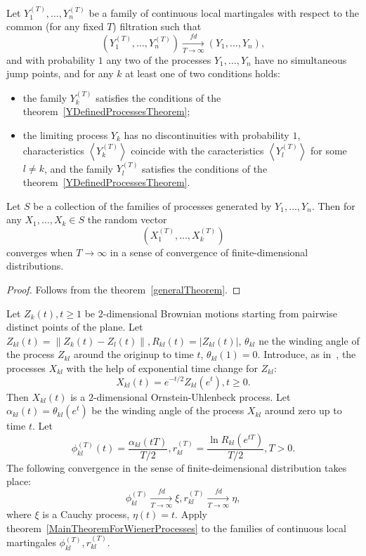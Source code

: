 \documentclass[12pt, a4paper, titlepage]{article}
\begin{document}
\begin{theorem}\label{MainTheoremForWienerProcesses}
 Let $Y_1^{(T)}, \ldots, Y_n^{(T)}$ be a family 
of continuous local martingales with respect to the common
(for any fixed $T$) filtration such that
$$(Y_1^{(T)}, \ldots, Y_n^{(T)})\xrightarrow[T \to \infty]{fd} (Y_1, \ldots, Y_n),$$
and with probability $1$ any two of the processes
$Y_1, \ldots, Y_n$
have no simultaneous jump points, and for any $k$ 
at least one of two conditions holds: 
\begin{itemize}
 \item the family $Y_k^{(T)}$ satisfies the conditions of the theorem~\ref{YDefinedProcessesTheorem};
 \item the limiting process $Y_k$ 
has no discontinuities with probability $1$,
characteristics $\left<Y_k^{(T)}\right>$ coincide with the caracteristics
$\left<Y_l^{(T)}\right>$ for some $l \ne k$, and the family
$Y_l^{(T)}$ satisfies the conditions of the theorem~\ref{YDefinedProcessesTheorem}. 
\end{itemize}
Let $S$ be a collection of the families of processes
generated by $Y_1, \ldots, Y_n$.
Then for any $X_1, \ldots, X_k \in S$ the random vector
$$(X_1^{(T)}, \ldots, X_k^{(T)})$$
converges when $T \to \infty$ in a sense of convergence of finite-dimensional distributions.  
\end{theorem}
\begin{proof}
  Follows from the theorem~\ref{generalTheorem}.  
\end{proof}

Let $Z_k(t), t \ge 1$ be $2$-dimensional Brownian motions starting from pairwise
distinct points of the plane. Let $Z_{kl}(t)=\|Z_k(t)-Z_l(t)\|, R_{kl}(t)=|Z_{kl}(t)|$,
$\theta_{kl}$ ne the winding angle of the process $Z_{kl}$ around the originup to time $t$, $\theta_{kl}(1)=0.$
Introduce, as in~\cite{BertoinWerner}, the processes $X_{kl}$ with the help of exponential time change
for $Z_{kl}$:
$$X_{kl}(t)=e^{-t/2}Z_{kl}(e^t), t \ge 0.$$
Then $X_{kl}(t)$ is a $2$-dimensional Ornstein-Uhlenbeck process.  
Let $\alpha_{kl}(t)=\theta_{kl}(e^t)$ be the winding angle 
of the process $X_{kl}$ around zero up to time $t$. Let 
$$\phi_{kl}^{(T)}(t)=\frac{\alpha_{kl}(tT)}{T/2}, 
r_{kl}^{(T)}=\frac{\ln{R_{kl}(e^{tT})}}{T/2}, T>0.$$
The following convergence in the sense of finite-deimensional distribution takes place:
$$\phi_{kl}^{(T)}\xrightarrow[T \to \infty]{fd}\xi, r_{kl}^{(T)}\xrightarrow[T \to \infty]{fd}\eta,$$
where $\xi$ is a Cauchy process, $\eta(t)=t.$
Apply theorem~\ref{MainTheoremForWienerProcesses} to the families of continuous 
local martingales
$\phi_{kl}^{(T)}, r_{kl}^{(T)}.$
\end{document}
